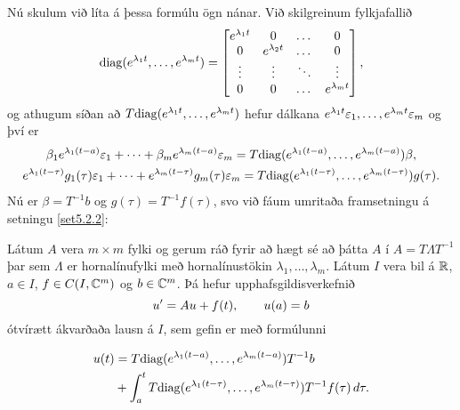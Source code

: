 Nú skulum við líta á þessa formúlu ögn nánar.  Við skilgreinum  fylkjafallið
$${\operatorname{diag}}(e^{\lambda_1t},\dots,e^{\lambda_mt})=
\left[\begin{matrix}
e\sp{\lambda_1t}&0&\dots&0\\
0&e\sp{\lambda_2t}&\dots&0\\
\vdots&\vdots&\ddots&\vdots\\
0&0&\dots&e^{\lambda_mt}
\end{matrix}\right],
$$
og athugum síðan að $T{\operatorname{diag}}(e^{\lambda_1t},\dots,e^{\lambda_mt})$ 
hefur dálkana
$e\sp{\lambda_1t}\varepsilon_1,\dots,e\sp{\lambda_mt}\varepsilon_m$ og því
er 
\begin{gather*}
\beta_1e^{\lambda_1(t-a)}\varepsilon_1+
\cdots+\beta_me^{\lambda_m(t-a)}\varepsilon_m=
T{\operatorname{diag}}(e^{\lambda_1(t-a)},\dots,e^{\lambda_m(t-a)})\beta,\\
e^{\lambda_1(t-\tau)}g_1(\tau)\varepsilon_1
+\cdots+
e^{\lambda_m(t-\tau)}g_m(\tau)\varepsilon_m=
T{\operatorname{diag}}(e^{\lambda_1(t-\tau)},\dots,e^{\lambda_m(t-\tau)})g(\tau).
\end{gather*}
Nú er $\beta=T^{-1}b$ og $g(\tau)=T^{-1}f(\tau)$, svo við fáum umritaða
framsetningu á setningu \ref{set5.2.2}:

\begin{se}
Látum $A$ vera $m\times m$ fylki og gerum ráð fyrir að hægt sé að
þátta $A$ í $A=T\Lambda T^{-1}$ þar sem $\Lambda $ er hornalínufylki með
hornalínustökin $\lambda_1,\dots,\lambda_m$.  Látum $I$ vera bil á
${\mathbb R}$, $a\in I$, $f\in C(I,{\mathbb C}^m)$ og $b\in {\mathbb C}^m$.  Þá hefur
upphafsgildisverkefnið  $$u{\sp{\prime}}=Au+f(t), \qquad u(a)=b
 $$
ótvírætt ákvarðaða lausn á $I$, sem gefin er með formúlunni
 
\begin{align*}
u(t)&=T{\operatorname{diag}}(e^{\lambda_1(t-a)},\dots,e^{\lambda_m(t-a)})T^{-1}b\\
&+\int_a^t T{\operatorname{diag}}(e^{\lambda_1(t-\tau)},\dots,e^{\lambda_m(t-\tau)})
T^{-1}f(\tau)\, d\tau.
\end{align*}
 
\end{se}

